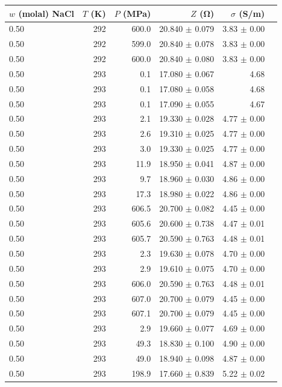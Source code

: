 \begin{table}[ht]
\centering
\begin{tabular}{lrrrrr}
\hline
$w$ (molal) NaCl & $T$ (K) & $P$ (MPa) & $Z$ (\si{\ohm}) & $\sigma$ (\si{S/m}) \\
\hline
0.50 & 292 & 600.0 & 20.840 $\pm$ 0.079 & 3.83 $\pm$ 0.00 \\
0.50 & 292 & 599.0 & 20.840 $\pm$ 0.078 & 3.83 $\pm$ 0.00 \\
0.50 & 292 & 600.0 & 20.840 $\pm$ 0.080 & 3.83 $\pm$ 0.00 \\
0.50 & 293 & 0.1 & 17.080 $\pm$ 0.067 & 4.68 \\
0.50 & 293 & 0.1 & 17.080 $\pm$ 0.058 & 4.68 \\
0.50 & 293 & 0.1 & 17.090 $\pm$ 0.055 & 4.67 \\
0.50 & 293 & 2.1 & 19.330 $\pm$ 0.028 & 4.77 $\pm$ 0.00 \\
0.50 & 293 & 2.6 & 19.310 $\pm$ 0.025 & 4.77 $\pm$ 0.00 \\
0.50 & 293 & 3.0 & 19.330 $\pm$ 0.025 & 4.77 $\pm$ 0.00 \\
0.50 & 293 & 11.9 & 18.950 $\pm$ 0.041 & 4.87 $\pm$ 0.00 \\
0.50 & 293 & 9.7 & 18.960 $\pm$ 0.030 & 4.86 $\pm$ 0.00 \\
0.50 & 293 & 17.3 & 18.980 $\pm$ 0.022 & 4.86 $\pm$ 0.00 \\
0.50 & 293 & 606.5 & 20.700 $\pm$ 0.082 & 4.45 $\pm$ 0.00 \\
0.50 & 293 & 605.6 & 20.600 $\pm$ 0.738 & 4.47 $\pm$ 0.01 \\
0.50 & 293 & 605.7 & 20.590 $\pm$ 0.763 & 4.48 $\pm$ 0.01 \\
0.50 & 293 & 2.3 & 19.630 $\pm$ 0.078 & 4.70 $\pm$ 0.00 \\
0.50 & 293 & 2.9 & 19.610 $\pm$ 0.075 & 4.70 $\pm$ 0.00 \\
0.50 & 293 & 606.0 & 20.590 $\pm$ 0.763 & 4.48 $\pm$ 0.01 \\
0.50 & 293 & 607.0 & 20.700 $\pm$ 0.079 & 4.45 $\pm$ 0.00 \\
0.50 & 293 & 607.1 & 20.700 $\pm$ 0.079 & 4.45 $\pm$ 0.00 \\
0.50 & 293 & 2.9 & 19.660 $\pm$ 0.077 & 4.69 $\pm$ 0.00 \\
0.50 & 293 & 49.3 & 18.830 $\pm$ 0.100 & 4.90 $\pm$ 0.00 \\
0.50 & 293 & 49.0 & 18.940 $\pm$ 0.098 & 4.87 $\pm$ 0.00 \\
0.50 & 293 & 198.9 & 17.660 $\pm$ 0.839 & 5.22 $\pm$ 0.02 \\

\end{tabular}
\end{table}
